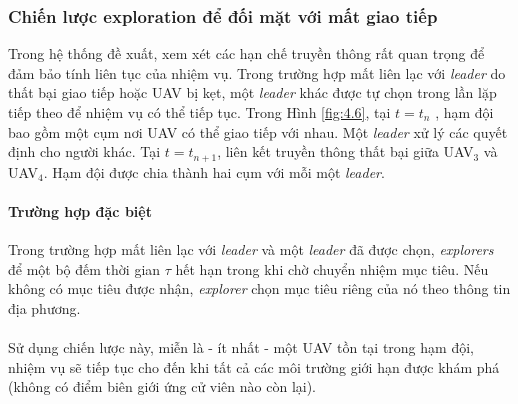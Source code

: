 \documentclass[11pt,openany]{book}
\begin{document}
\subsubsection{Chiến lược exploration để đối mặt với mất giao tiếp}
Trong hệ thống đề xuất, xem xét các hạn chế truyền thông rất quan trọng để đảm bảo tính liên tục của nhiệm vụ. Trong trường hợp mất liên lạc với \textit{leader} do thất bại giao tiếp hoặc UAV bị kẹt, một \textit{leader} khác được tự chọn trong lần lặp tiếp theo để nhiệm vụ có thể tiếp tục. Trong Hình \ref{fig:4.6}, tại $t=t_n$ , hạm đội bao gồm một cụm nơi UAV có thể giao tiếp với nhau. Một \textit{leader} xử lý các quyết định cho người khác. Tại $t=t_{n+1}$, liên kết truyền thông thất bại giữa UAV$_3$ và UAV$_4$. Hạm đội được chia thành hai cụm với mỗi một \textit{leader}.
\paragraph{Trường hợp đặc biệt}
Trong trường hợp mất liên lạc với \textit{leader} và một \textit{leader} đã được chọn, \textit{explorers} để một bộ đếm thời gian $\tau$ hết hạn trong khi chờ chuyển nhiệm mục tiêu. Nếu không có mục tiêu được nhận, \textit{explorer} chọn mục tiêu riêng của nó theo thông tin địa phương.\\\\
Sử dụng chiến lược này, miễn là - ít nhất - một UAV tồn tại trong hạm đội, nhiệm vụ sẽ tiếp tục cho đến khi tất cả các môi trường giới hạn được khám phá (không có điểm biên giới ứng cử viên nào còn lại).
\end{document}
